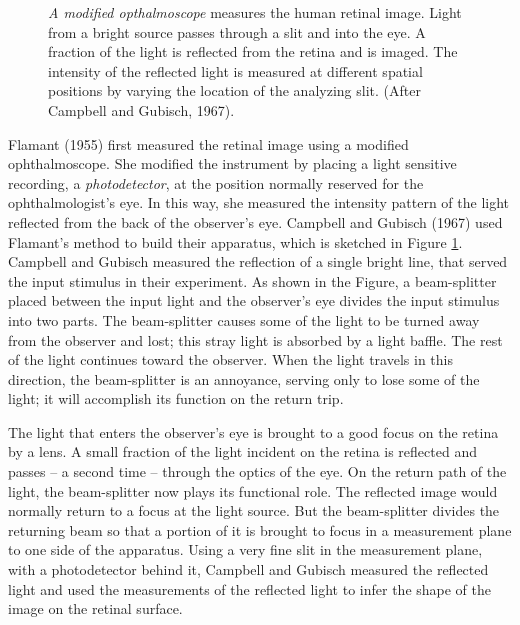 \begin{figure}
\centerline {
}
\caption[Double Pass Instrument]{ 
{\em A modified opthalmoscope}
measures the human retinal image.
Light from a bright source passes through a slit and into the eye.
A fraction of the light is reflected from the retina
and is imaged.
The intensity of the reflected light is measured at different
spatial positions by varying the location of the analyzing slit.
(After Campbell and Gubisch, 1967).
}
\label{f1:cg.apparatus}
\end{figure}
Flamant (1955) first measured the retinal 
image using a modified ophthalmoscope.
She modified the instrument by placing a light sensitive recording,
a {\em photodetector}, at the position normally reserved for the ophthalmologist's eye.
In this way, she measured the intensity pattern of the light
reflected from the back of the observer's eye.
Campbell and Gubisch (1967) used Flamant's method
to build their apparatus, which
is sketched in Figure \ref{f1:cg.apparatus}.
Campbell and Gubisch measured
the reflection of a single bright line,
that served the input stimulus in their experiment.
As shown in the Figure, a beam-splitter placed 
between the input light and the
observer's eye divides the input stimulus
into two parts.
The beam-splitter causes some of the light to be turned away
from the observer and lost;
this stray light is absorbed by a light baffle.
The rest of the light continues toward the observer.
When the light travels in this direction, the beam-splitter is an annoyance,
serving only to lose some of the light;
it will accomplish its function on the return trip.

The light that enters the observer's eye is brought to 
a good focus on the retina by a lens.
A small fraction of the light incident on the retina
is reflected and passes -- a second time -- through the optics of the eye.
On the return path of the light,
the beam-splitter now plays its functional role.
The reflected image would normally return to a focus
at the light source.
But the beam-splitter
divides the returning beam so that a portion
of it is brought to focus in a measurement plane 
to one side of the apparatus.
Using a very fine slit in the
measurement plane, with a photodetector behind it,
Campbell and Gubisch measured the reflected light
and used the measurements of the reflected light
to infer the shape of the image on the retinal surface.

